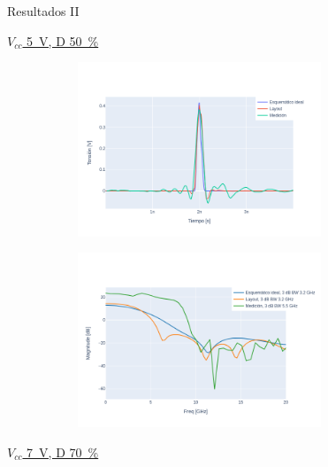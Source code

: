 \documentclass{beamer}
\begin{document}
\begin{frame}{Resultados II}

    \underline{$V_{cc}$ \qty{5}{\volt}, D \qty{50}{\percent}}

    \begin{figure}[t!]
        \centering
        \begin{subfigure}[b]{0.49\textwidth}
            \centering
            \includegraphics[width=0.8\textwidth]{images/plots/Vcc_5V_duty_50_time_domain.png}
            \label{fig:pulses_5v_50}
        \end{subfigure}
        \hfill
        \begin{subfigure}[b]{0.49\textwidth}
            \centering
            \includegraphics[width=0.8\textwidth]{images/plots/Vcc_5V_duty_50_psd.png}
            \label{fig:psd_5v_50}
        \end{subfigure}
        \label{fig:plots_5v_50}
    \end{figure}

    \underline{$V_{cc}$ \qty{7}{\volt}, D \qty{70}{\percent}}


\end{frame}
\end{document}
